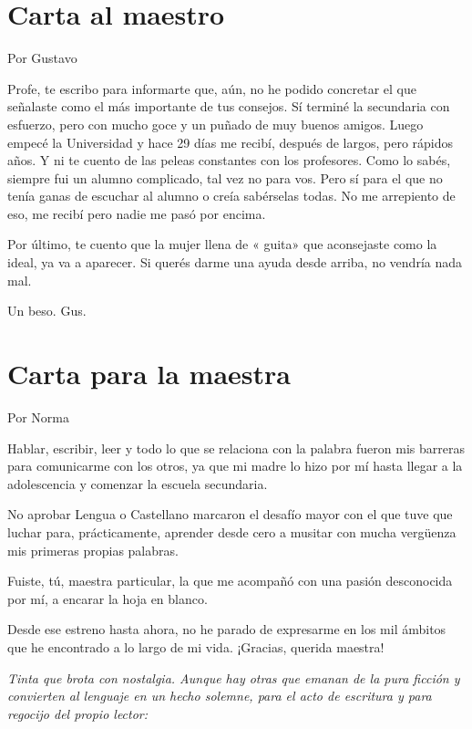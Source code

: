 \documentclass[11pt,twoside,openright,a5paper]{book}
\begin{document}
\section*{Carta al maestro}

\begin{flushright}Por Gustavo\end{flushright}

Profe, te escribo para informarte que, aún, no he podido concretar el que señalaste como el más importante de tus consejos. Sí terminé la secundaria con esfuerzo, pero con mucho goce y un puñado de muy buenos amigos. Luego empecé la Universidad y hace 29 días me recibí, después  de largos, pero rápidos años. Y ni te cuento de las peleas constantes con los profesores. Como lo sabés, siempre fui un alumno complicado, tal vez no para vos. Pero sí para el que no tenía ganas de escuchar al alumno o creía sabérselas todas. No me arrepiento de eso, me recibí pero nadie me pasó por encima.

Por último, te cuento que la mujer llena de « guita»  que aconsejaste como la ideal, ya va a aparecer. Si querés darme una ayuda desde arriba, no vendría nada mal.

Un beso. Gus.


\section*{Carta para la maestra}

                                                                          \begin{flushright}Por Norma\end{flushright}

Hablar, escribir, leer y todo lo que se relaciona con la palabra fueron mis barreras para comunicarme con los otros, ya que mi madre lo hizo por mí hasta llegar a la adolescencia y comenzar la escuela secundaria.

No aprobar Lengua o Castellano marcaron el desafío mayor con el que tuve que luchar para, prácticamente, aprender desde cero a musitar con mucha vergüenza mis primeras propias palabras.

Fuiste, tú, maestra particular, la que me acompañó con una pasión desconocida por mí,  a encarar la hoja en blanco.

Desde ese estreno hasta ahora, no he parado de expresarme en los mil ámbitos que he
encontrado a lo largo de mi vida. ¡Gracias, querida maestra!

\vspace{0.5cm}
\emph{Tinta que brota con nostalgia. Aunque hay otras que emanan de la pura ficción y convierten al lenguaje en un hecho solemne, para el acto de escritura y para regocijo del propio lector:}
\end{document}
